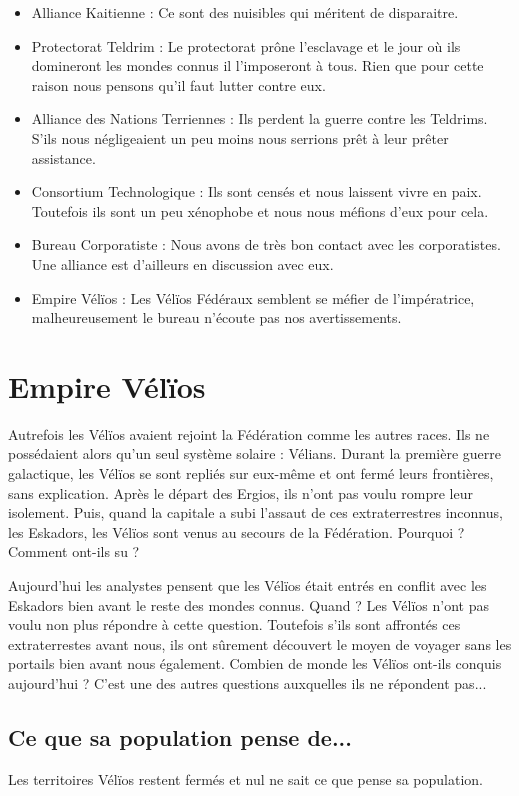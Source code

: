 \begin{multicols}{2}
\begin{itemize}
\item Alliance Kaitienne : Ce sont des nuisibles qui méritent de disparaitre.
\item Protectorat Teldrim : Le protectorat prône l'esclavage et le jour où ils domineront les mondes connus il l'imposeront à tous. Rien que pour cette raison nous pensons qu'il faut lutter contre eux.
\item Alliance des Nations Terriennes : Ils perdent la guerre contre les Teldrims. S’ils nous négligeaient un peu moins nous serrions prêt à leur prêter assistance.
\item Consortium Technologique : Ils sont censés et nous laissent vivre en paix. Toutefois ils sont un peu xénophobe et nous nous méfions d'eux pour cela.
\item Bureau Corporatiste : Nous avons de très bon contact avec les corporatistes. Une alliance est d'ailleurs en discussion avec eux.
\item Empire Vélïos : Les Vélïos Fédéraux semblent se méfier de l'impératrice, malheureusement le bureau n'écoute pas nos avertissements.
\end{itemize}

\section{Empire Vélïos}

Autrefois les Vélïos avaient rejoint la Fédération comme les autres races. Ils ne possédaient alors qu'un seul système solaire : Vélians. Durant la première guerre galactique, les Vélïos se sont repliés sur eux-même et ont fermé leurs frontières, sans explication. Après le départ des Ergios, ils n'ont pas voulu rompre leur isolement. Puis, quand la capitale a subi l'assaut de ces extraterrestres inconnus, les Eskadors, les Vélïos sont venus au secours de la Fédération. Pourquoi ? Comment ont-ils su ?

Aujourd'hui les analystes pensent que les Vélïos était entrés en conflit avec les Eskadors bien avant le reste des mondes connus. Quand ? Les Vélïos n'ont pas voulu non plus répondre à cette question. Toutefois s'ils sont affrontés ces extraterrestes avant nous, ils ont sûrement découvert le moyen de voyager sans les portails bien avant nous également. Combien de monde les Vélïos ont-ils conquis aujourd'hui ? C'est une des autres questions auxquelles ils ne répondent pas...

\subsection{Ce que sa population pense de...}

Les territoires Vélïos restent fermés et nul ne sait ce que pense sa population.

\end{multicols}
